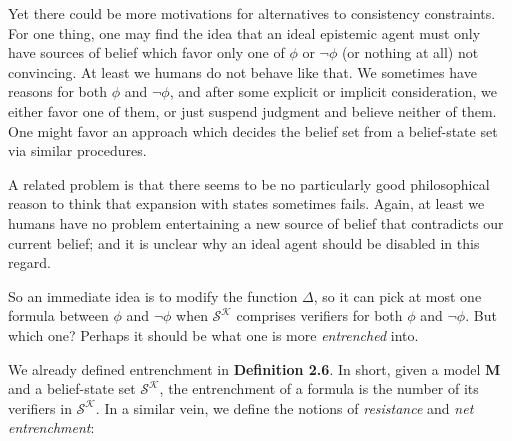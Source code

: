 \documentclass[12pt]{article}
\newcommand{\SK}{\mathcal{S}^\mathcal{K}}
\begin{document}
Yet there could be more motivations for alternatives to consistency constraints. For one thing, one may find the idea that an ideal epistemic agent must only have sources of belief which favor only one of $\phi$ or $\lnot \phi$ (or nothing at all) not convincing. At least we humans do not behave like that. We sometimes have reasons for both $\phi$ and $\lnot \phi$, and after some explicit or implicit consideration, we either favor one of them, or just suspend judgment and believe neither of them. One might favor an approach which decides the belief set from a belief-state set via similar procedures. 
\par
A related problem is that there seems to be no particularly good philosophical reason to think that expansion with states sometimes fails. Again, at least we humans have no problem entertaining a new source of belief that contradicts our current belief; and it is unclear why an ideal agent should be disabled in this regard. 
\par
So an immediate idea is to modify the function $\Delta$, so it can pick at most one formula between $\phi$ and $\lnot \phi$ when $\SK$ comprises verifiers for both $\phi$ and $\lnot \phi$. But which one? Perhaps it should be what one is more \textit{entrenched} into. 
\par
We already defined entrenchment in \textbf{Definition 2.6}. In short, given a model $\bm{M}$ and a belief-state set $\SK$, the entrenchment of a formula is the number of its verifiers in $\SK$. In a similar vein, we define the notions of \textit{resistance} and \textit{net entrenchment}:
\end{document}

